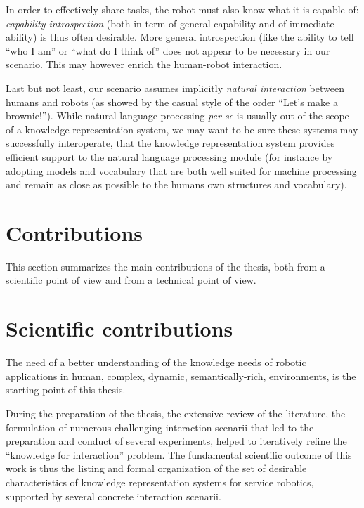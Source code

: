 In order to effectively share tasks, the robot must also know what it is
capable of: \emph{capability introspection} (both in term of general capability
and of immediate ability) is thus often desirable. More general introspection
(like the ability to tell ``who I am'' or ``what do I think of'' does not
appear to be necessary in our scenario. This may however enrich the human-robot
interaction.

Last but not least, our scenario assumes implicitly \emph{natural interaction}
between humans and robots (as showed by the casual style of the
order ``Let's make a brownie!''). While natural language processing {\it
per-se} is usually out of the scope of a knowledge representation system, we
may want to be sure these systems may successfully interoperate, \ie that the
knowledge representation system provides efficient support to the natural
language processing module (for instance by adopting models and vocabulary that
are both well suited for machine processing and remain as close as possible to
the humans own structures and vocabulary).



\section{Contributions}
\label{sect|contributions}

This section summarizes the main contributions of the thesis, both from a
scientific point of view and from a technical point of view.

\section{Scientific contributions}
\label{sect|scientific-contributions}

The need of a better understanding of the knowledge needs of robotic
applications in human, \ie complex, dynamic, semantically-rich, environments,
is the starting point of this thesis. 

During the preparation of the thesis, the extensive review of the literature,
the formulation of numerous challenging interaction scenarii that led to the
preparation and conduct of several experiments, helped to iteratively refine
the ``knowledge for interaction'' problem. The fundamental scientific outcome
of this work is thus the listing and formal organization of the set of
desirable characteristics of knowledge representation systems for service
robotics, supported by several concrete interaction scenarii.

